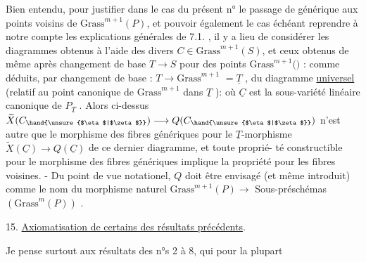 
Bien entendu, pour justifier dans le cas  du présent n° le passage
de \hand{$\eta$} générique aux points voisins de $\mathrm{Grass}^{m+1}(P)$, et pouvoir également
le cas échéant reprendre à notre compte les explications générales de
7.1. , il y a lieu de considérer les diagrammes
obtenus à l'aide des divers $C \in \mathrm{Grass}^{m+1}(S)$, et  ceux obtenus de même
après changement de base $T \to S$ pour des points \hand{$\zeta$} \hand{$\in$} $\mathrm{Grass}^{m+1}($$)$ :
comme déduits, par changement de base \hand{$\zeta$} : $T \longrightarrow \mathrm{Grass}^{m+1}$ $= \underline{T}$ ,
du diagramme \uline{universel} (relatif au point canonique de $\mathrm{Grass}^{m+1}$ dans $\underline{T}$ ):
où $\underline{C}$ est la sous-variété linéaire canonique de $P_{\underline{T}}$ . Alors ci-dessus
$\widetilde{X}(C_{\hand{\unsure{$\eta$|$\zeta$}}}) \longrightarrow Q(C_{\hand{\unsure{$\eta$|$\zeta$}}})$ n'est autre que le morphisme des fibres génériques pour
le $\underline{T}$-morphisme $\widetilde{X}(\underline{C}) \longrightarrow Q(\underline{C})$ de ce dernier diagramme, et toute propri\'e-%
té constructible pour  le morphisme des fibres génériques implique
la propriété pour les fibres voisines. - Du point de vue notationel,
$Q$ doit être envisagé (et même introduit) comme le nom du morphisme 
naturel $\mathrm{Grass}^{m+1}(P) \longrightarrow$  Sous-préschémas $(\mathrm{Grass}^{m}(P))$ .

15. \uline{Axiomatisation de certains des résultats précédents}.

Je pense surtout aux résultats des n°s 2 à 8, qui pour la plupart

